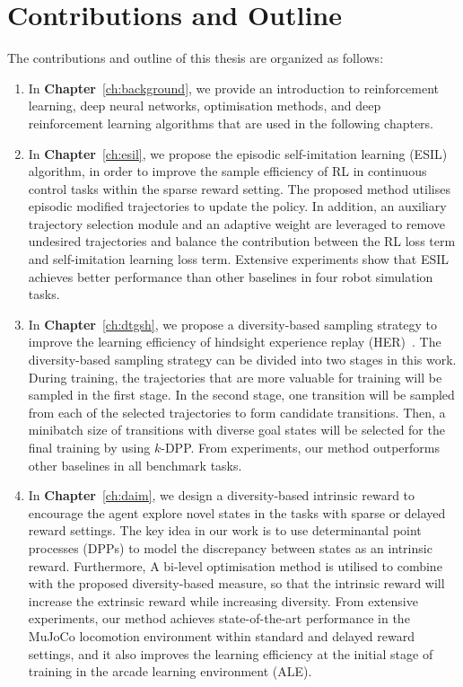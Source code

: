 \section{Contributions and Outline}
The contributions and outline of this thesis are organized as follows:
\begin{enumerate}
    \item In \textbf{Chapter}~\ref{ch:background}, we provide an introduction to reinforcement learning, deep neural networks, optimisation methods, and deep reinforcement learning algorithms that are used in the following chapters.
   
    \item In \textbf{Chapter}~\ref{ch:esil}, we propose the episodic self-imitation learning (ESIL) algorithm, in order to improve the sample efficiency of RL in continuous control tasks within the sparse reward setting. The proposed method utilises episodic modified trajectories to update the policy. In addition, an auxiliary trajectory selection module and an adaptive weight are leveraged to remove undesired trajectories and balance the contribution between the RL loss term and self-imitation learning loss term. Extensive experiments show that ESIL achieves better performance than other baselines in four robot simulation tasks. 
    
    \item In \textbf{Chapter}~\ref{ch:dtgsh}, we propose a diversity-based sampling strategy to improve the learning efficiency of hindsight experience replay (HER)~\cite{andrychowicz2017hindsight}. The diversity-based sampling strategy can be divided into two stages in this work. During training, the trajectories that are more valuable for training will be sampled in the first stage. In the second stage, one transition will be sampled from each of the selected trajectories to form candidate transitions. Then, a minibatch size of transitions with diverse goal states will be selected for the final training by using $k$-DPP. From experiments, our method outperforms other baselines in all benchmark tasks.
    
    \item In \textbf{Chapter}~\ref{ch:daim}, we design a diversity-based intrinsic reward to encourage the agent explore novel states in the tasks with sparse or delayed reward settings. The key idea in our work is to use determinantal point processes (DPPs) to model the discrepancy between states as an intrinsic reward. Furthermore, A bi-level optimisation method is utilised to combine with the proposed diversity-based measure, so that the intrinsic reward will increase the extrinsic reward while increasing diversity. From extensive experiments, our method achieves state-of-the-art performance in the MuJoCo locomotion environment within standard and delayed reward settings, and it also improves the learning efficiency at the initial stage of training in the arcade learning environment (ALE). 
    

\end{enumerate}
